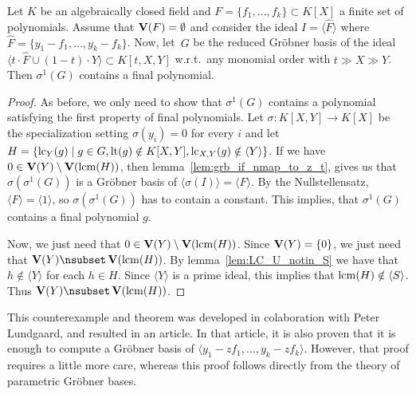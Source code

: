 \begin{theorem}
  Let $K$ be an algebraically closed field and $F = \{f_{1}, \dots, f_{k}\} \subset K[X]$ a finite set of polynomials. Assume that $\operatorname{\mathbf V}(F) = \emptyset$ and consider the ideal $I = \langle \hat F \rangle$ where $\hat F = \{y_{1} - f_{1}, \dots, y_{k} - f_{k}\}$. Now, let $\,G$ be the reduced Gröbner basis of the ideal $\langle t \cdot \hat F \cup (1 - t) \cdot Y \rangle \subset K[t, X, Y]$ w.r.t.\ any monomial order with $t \gg X \gg Y$. Then $\sigma^{1}(G)$ contains a final polynomial.
\end{theorem}
\begin{proof}
  As before, we only need to show that $\sigma^{1}(G)$ contains a polynomial satisfying the first property of final polynomials. Let $\sigma : K[X, Y] \to K[X]$ be the specialization setting $\sigma(y_{i}) = 0$ for every $i$ and let $H = \{\operatorname{lc}_{Y}(g) \mid g \in G, \operatorname{lt}(g) \notin K[X, Y], \operatorname{lc}_{X, Y}(g) \notin \langle Y \rangle\}$. If we have $0 \in \operatorname{\mathbf V}(Y) \setminus \operatorname{\mathbf V}(\operatorname{lcm}(H))$, then lemma~\ref{lem:grb_if_nmap_to_z_t}, gives us that $\sigma(\sigma^{1}(G))$ is a Gröbner basis of $\langle \sigma(I) \rangle = \langle F \rangle$. By the Nullstellensatz, $\langle F \rangle = \langle 1 \rangle$, so $\sigma(\sigma^{1}(G))$ has to contain a constant. This implies, that $\sigma^{1}(G)$ contains a final polynomial $g$.

  Now, we just need that $0 \in \operatorname{\mathbf V}(Y) \setminus \operatorname{\mathbf V}(\operatorname{lcm}(H))$. Since $\operatorname{\mathbf V}(Y) = \{0\}$, we just need that $\V(Y) \nsubset \V(\lcm(H))$. By lemma~\ref{lem:LC_U_notin_S} we have that $h \notin \langle Y \rangle$ for each $h \in H$. Since $\langle Y \rangle$ is a prime ideal, this implies that $\operatorname{lcm}(H) \notin \langle S \rangle$. Thus $\V(Y) \nsubset \V(\lcm(H))$.
\end{proof}

This counterexample and theorem was developed in colaboration with Peter Lundgaard, and resulted in an article\cite{Lundgaard_Poulsen}. In that article, it is also proven that it is enough to compute a Gröbner basis of $\langle y_{1} - z f_{1}, \dots, y_{k} - z f_{k} \rangle$. However, that proof requires a little more care, whereas this proof follows directly from the theory of parametric Gröbner bases.

